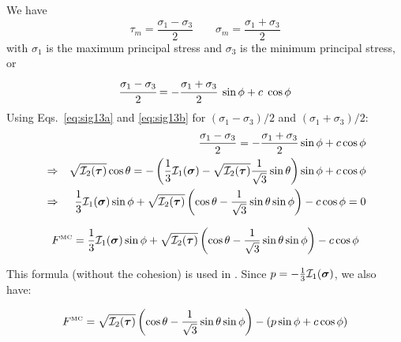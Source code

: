 We have  
\[
\tau_m=\frac{\sigma_1-\sigma_3}{2}
\qquad
\sigma_m = \frac{\sigma_1+\sigma_3}{2}
\]
with $\sigma_1$ is the maximum principal stress and $\sigma_3$ is the minimum principal stress, or
\[
\cfrac{\sigma_1-\sigma_3}{2} = 
-\cfrac{\sigma_1+\sigma_3}{2}~\sin\phi 
+c\; \cos\phi 
\]
Using Eqs.~\ref{eq:sig13a} and \ref{eq:sig13b} 
for $(\sigma_1 - \sigma_3 )/2$ and $(\sigma_1 + \sigma_3 )/2$:
\begin{eqnarray}
&& \frac{\sigma_1 - \sigma_3}{2} = -\frac{\sigma_1 + \sigma_3}{2} \sin \phi  + c \cos \phi \nonumber\\
&\Rightarrow&
\sqrt{  {\cal I}_2({\bm \tau}) } \cos \theta = -\left(\frac{1}{3}{\cal I}_1({\bm \sigma}) - \sqrt{  {\cal I}_2({\bm \tau})} \frac{1}{\sqrt{3}} \sin \theta \right) \sin \phi 
+ c \cos \phi \nonumber\\
&\Rightarrow&
\frac{1}{3} {\cal I}_1({\bm \sigma}) \sin \phi  
+ \sqrt{  {\cal I}_2({\bm \tau}) } \left( \cos \theta - \frac{1}{\sqrt{3}} \sin \theta  \sin \phi \right) - c \cos \phi = 0 \nonumber
\end{eqnarray}

\begin{mdframed}[backgroundcolor=blue!5]
\begin{equation}
F^{\text{\tiny MC}}=\frac{1}{3} {\cal I}_1({\bm \sigma}) \sin \phi  + 
\sqrt{  {\cal I}_2({\bm \tau})  } \left( \cos \theta - \frac{1}{\sqrt{3}} \sin \theta  \sin \phi \right) - c \cos \phi
\label{eq:mcF} 
\end{equation}
\end{mdframed}
This formula (without the cohesion) is used in \cite{will92}.
Since $p=-\frac{1}{3} {\cal I}_1({\bm \sigma})$, we also have:
\begin{mdframed}[backgroundcolor=blue!5]
\begin{equation}
F^{\text{\tiny MC}}=
\sqrt{  {\cal I}_2({\bm \tau})  } \left( \cos \theta - \frac{1}{\sqrt{3}} \sin \theta  \sin \phi \right) - (p \sin\phi + c \cos \phi)
\end{equation}
\end{mdframed}







